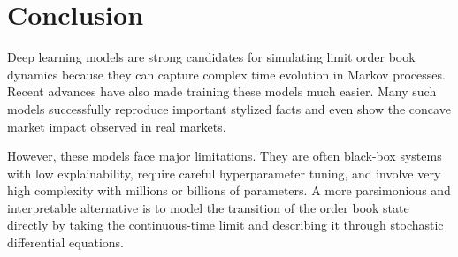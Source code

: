 \section{Conclusion}
Deep learning models are strong candidates for simulating limit order book dynamics because they can capture complex time evolution in Markov processes. Recent advances have also made training these models much easier. Many such models successfully reproduce important stylized facts and even show the concave market impact observed in real markets.

However, these models face major limitations. They are often black-box systems with low explainability, require careful hyperparameter tuning, and involve very high complexity with millions or billions of parameters. A more parsimonious and interpretable alternative is to model the transition of the order book state directly by taking the continuous-time limit and describing it through stochastic differential equations.